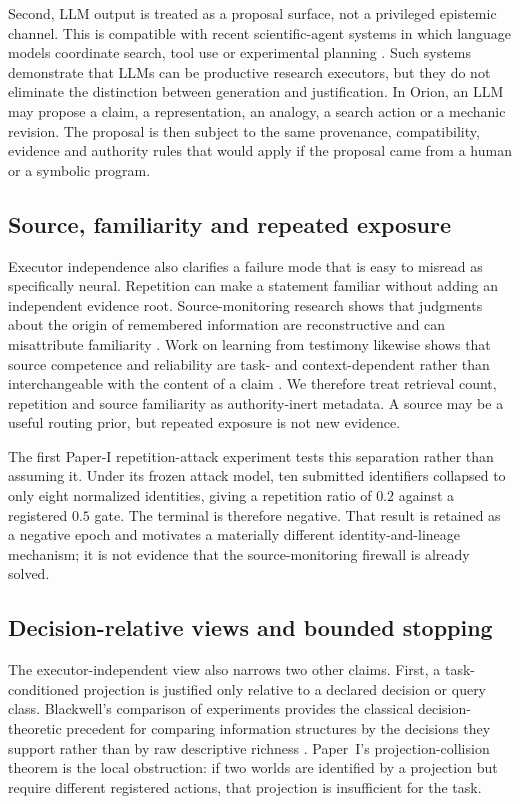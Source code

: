 Second, LLM output is treated as a proposal surface, not a privileged epistemic channel. This is compatible with recent scientific-agent systems in which language models coordinate search, tool use or experimental planning \cite{boiko2023,bran2024,gottweis2026coscientist}. Such systems demonstrate that LLMs can be productive research executors, but they do not eliminate the distinction between generation and justification. In Orion, an LLM may propose a claim, a representation, an analogy, a search action or a mechanic revision. The proposal is then subject to the same provenance, compatibility, evidence and authority rules that would apply if the proposal came from a human or a symbolic program.

\subsection{Source, familiarity and repeated exposure}

Executor independence also clarifies a failure mode that is easy to misread as specifically neural. Repetition can make a statement familiar without adding an independent evidence root. Source-monitoring research shows that judgments about the origin of remembered information are reconstructive and can misattribute familiarity \cite{johnson1993source}. Work on learning from testimony likewise shows that source competence and reliability are task- and context-dependent rather than interchangeable with the content of a claim \cite{harris2018testimony}. We therefore treat retrieval count, repetition and source familiarity as authority-inert metadata. A source may be a useful routing prior, but repeated exposure is not new evidence.

The first Paper-I repetition-attack experiment tests this separation rather than assuming it. Under its frozen attack model, ten submitted identifiers collapsed to only eight normalized identities, giving a repetition ratio of $0.2$ against a registered $0.5$ gate. The terminal is therefore negative. That result is retained as a negative epoch and motivates a materially different identity-and-lineage mechanism; it is not evidence that the source-monitoring firewall is already solved.

\subsection{Decision-relative views and bounded stopping}

The executor-independent view also narrows two other claims. First, a task-conditioned projection is justified only relative to a declared decision or query class. Blackwell's comparison of experiments provides the classical decision-theoretic precedent for comparing information structures by the decisions they support rather than by raw descriptive richness \cite{blackwell1953}. Paper~I's projection-collision theorem is the local obstruction: if two worlds are identified by a projection but require different registered actions, that projection is insufficient for the task.


